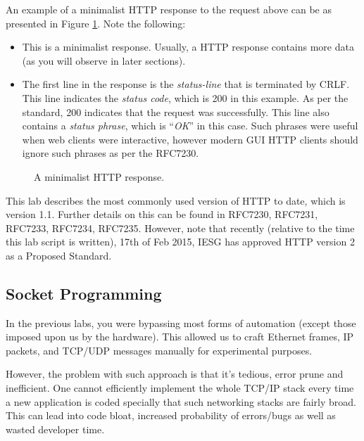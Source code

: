 \documentclass[pdftex,12pt,a4paper]{article}
\begin{document}
            An example of a minimalist HTTP response to the request above can
            be as presented in Figure \ref{fig:response}. Note the following:
            \begin{itemize}
                \item This is a minimalist response. Usually, a HTTP response
                    contains more data (as you will observe in later sections).
                \item The first line in the response is the \emph{status-line}
                    that is terminated by CRLF. This line indicates the
                    \emph{status code}, which is 200 in this example. As per
                    the standard, 200 indicates that the request was
                    successfully. This line also contains a \emph{status
                    phrase}, which is ``\emph{OK}'' in this case. Such phrases
                    were useful when web clients were interactive, however
                    modern GUI HTTP clients should ignore such phrases as per
                    the RFC7230.
            \end{itemize}
            \begin{figure}[tbh]
                \centering
                
                \caption{A minimalist HTTP response.}
                \label{fig:response}
            \end{figure}

            This lab describes the most commonly used version of HTTP to date,
            which is version 1.1. Further details on this can be found in
            RFC7230, RFC7231, RFC7233, RFC7234, RFC7235. However, note that
            recently (relative to the time this lab script is written), 17th of
            Feb 2015, IESG has approved HTTP version 2 as a Proposed Standard.

        \subsection{Socket Programming}
            In the previous labs, you were bypassing most forms of automation
            (except those imposed upon us by the hardware). This allowed us to
            craft Ethernet frames, IP packets, and TCP/UDP messages manually
            for experimental purposes.

            However, the problem with such approach is that it's tedious, error
            prune and inefficient. One cannot efficiently implement the whole
            TCP/IP stack every time a new application is coded specially that
            such networking stacks are fairly broad. This can lead into code
            bloat, increased probability of errors/bugs as well as wasted
            developer time.
\end{document}
